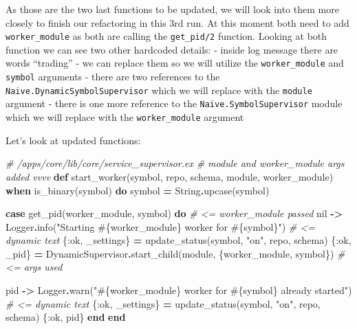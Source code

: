 \documentclass[
]{book}
\newenvironment{Shaded}{\begin{snugshade}}{\end{snugshade}}
\newcommand{\CommentTok}[1]{\textcolor[rgb]{0.56,0.35,0.01}{\textit{#1}}}
\newcommand{\ConstantTok}[1]{\textcolor[rgb]{0.00,0.00,0.00}{#1}}
\newcommand{\KeywordTok}[1]{\textcolor[rgb]{0.13,0.29,0.53}{\textbf{#1}}}
\newcommand{\NormalTok}[1]{#1}
\newcommand{\OperatorTok}[1]{\textcolor[rgb]{0.81,0.36,0.00}{\textbf{#1}}}
\newcommand{\OtherTok}[1]{\textcolor[rgb]{0.56,0.35,0.01}{#1}}
\newcommand{\StringTok}[1]{\textcolor[rgb]{0.31,0.60,0.02}{#1}}
\newcommand{\VariableTok}[1]{\textcolor[rgb]{0.00,0.00,0.00}{#1}}
\begin{document}
As those are the two last functions to be updated, we will look into them more closely to finish our refactoring in this 3rd run. At this moment both need to add \texttt{worker\_module} as both are calling the \texttt{get\_pid/2} function. Looking at both function we can see two other hardcoded details:
- inside log message there are words ``trading'' - we can replace them so we will utilize the \texttt{worker\_module} and \texttt{symbol} arguments
- there are two references to the \texttt{Naive.DynamicSymbolSupervisor} which we will replace with the \texttt{module} argument
- there is one more reference to the \texttt{Naive.SymbolSupervisor} module which we will replace with the \texttt{worker\_module} argument

Let's look at updated functions:

\begin{Shaded}
\begin{Highlighting}[]
  \CommentTok{\# /apps/core/lib/core/service\_supervisor.ex}
  \CommentTok{\# module and worker\_module args added vvvv}
  \KeywordTok{def}\NormalTok{ start\_worker(symbol, repo, schema, module, worker\_module)}
      \KeywordTok{when}\NormalTok{ is\_binary(symbol) }\KeywordTok{do}
\NormalTok{    symbol }\OperatorTok{=} \ConstantTok{String}\OperatorTok{.}\NormalTok{upcase(symbol)}

    \KeywordTok{case}\NormalTok{ get\_pid(worker\_module, symbol) }\KeywordTok{do} \CommentTok{\# \textless{}= worker\_module passed}
      \ConstantTok{nil} \OperatorTok{{-}\textgreater{}}
        \ConstantTok{Logger}\OperatorTok{.}\NormalTok{info(}\StringTok{"Starting }\OtherTok{\#\{}\NormalTok{worker\_module}\OtherTok{\}}\StringTok{ worker for }\OtherTok{\#\{}\NormalTok{symbol}\OtherTok{\}}\StringTok{"}\NormalTok{) }\CommentTok{\# \textless{}= dynamic text}
\NormalTok{        \{}\VariableTok{:ok}\NormalTok{, \_settings\} }\OperatorTok{=}\NormalTok{ update\_status(symbol, }\StringTok{"on"}\NormalTok{, repo, schema)}
\NormalTok{        \{}\VariableTok{:ok}\NormalTok{, \_pid\} }\OperatorTok{=} \ConstantTok{DynamicSupervisor}\OperatorTok{.}\NormalTok{start\_child(module, \{worker\_module, symbol\}) }\CommentTok{\# \textless{}= args used}

\NormalTok{      pid }\OperatorTok{{-}\textgreater{}}
        \ConstantTok{Logger}\OperatorTok{.}\NormalTok{warn(}\StringTok{"}\OtherTok{\#\{}\NormalTok{worker\_module}\OtherTok{\}}\StringTok{ worker for }\OtherTok{\#\{}\NormalTok{symbol}\OtherTok{\}}\StringTok{ already started"}\NormalTok{) }\CommentTok{\# \textless{}= dynamic text}
\NormalTok{        \{}\VariableTok{:ok}\NormalTok{, \_settings\} }\OperatorTok{=}\NormalTok{ update\_status(symbol, }\StringTok{"on"}\NormalTok{, repo, schema)}
\NormalTok{        \{}\VariableTok{:ok}\NormalTok{, pid\}}
    \KeywordTok{end}
  \KeywordTok{end}


\end{Highlighting}
\end{Shaded}
\end{document}
